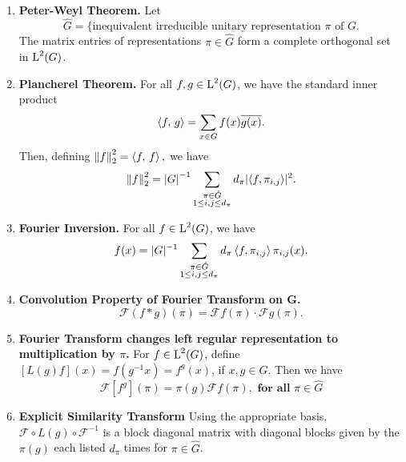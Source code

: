 \begin{theorem}~
\begin{enumerate}
\item \textbf{Peter-Weyl Theorem.} Let
\[\hat{G}=\{\text{inequivalent irreducible unitary representation $\pi$ of $G$}.\]
The matrix entries of representations $\pi\in\hat{G}$ form a complete orthogonal set in $\operatorname{L}^2(G)$.
\item \textbf{Plancherel Theorem.} For all $f,g\in \operatorname{L}^2(G)$, we have the standard inner product
\[
\braket{f,\,g}=\sum_{x\in G}f(x)\overline{g(x)}.
\]
Then, defining ${\left\lVert f\right\rVert}_2^2=\braket{f,\, f},$ we have 
\[
{\left\lVert f\right\rVert}_2^2={\lvert G\rvert}^{-1} \sum_{\substack{\pi \in \hat{G} \\1\leq i,j\leq d_\pi}}d_\pi \lvert\braket{f,\pi_{i,j}}\rvert^2.
\]
\item \textbf{Fourier Inversion.} For all $f\in \operatorname{L}^2(G)$, we have
\[
f(x)=\lvert G\rvert^{-1}\sum_{\substack{\pi \in \hat{G} \\1\leq i,j\leq d_\pi }}d_\pi\braket{f,\pi_{i,j}}\pi_{i,j}(x).
\]
\item \textbf{Convolution Property of Fourier Transform on G.} 
\[
\mathscr{F}(f*g)(\pi)=\mathscr{F}f(\pi)\cdot \mathscr{F}g(\pi).
\]
\item \textbf{  Fourier Transform changes left regular representation to multiplication by $\pi$.} For $f\in \operatorname{L}^2(G)$, define $[L(g)f](x)=f(g^{-1}x)=f^g(x)$, if $x,g\in G$. Then we have 
\[
\mathscr{F}[f^g](\pi)=\pi(g)\mathscr{F}f(\pi), \textbf{ for all $\pi \in \hat{G}$}
\]  
\item \textbf{Explicit Similarity Transform} Using the appropriate basis, $\mathscr{F}\circ L(g)\circ \mathscr{F}^{-1}$ is a block diagonal matrix with diagonal blocks given by the $\pi(g)$ each listed $d_\pi$ times for $\pi \in \hat{G}$.
\end{enumerate}
\end{theorem}
